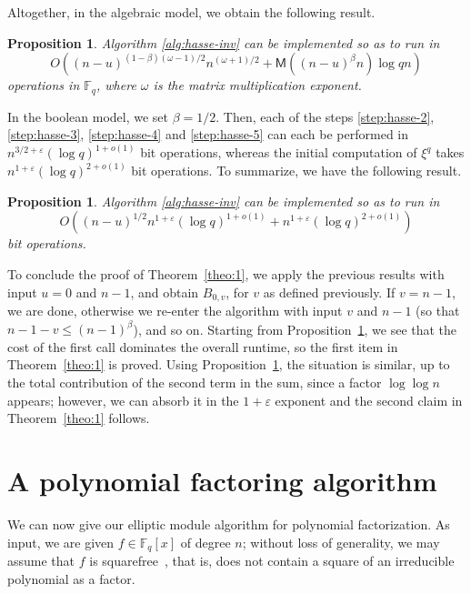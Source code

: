 \documentclass[12pt]{article}
\theoremstyle{plain}
\newtheorem{proposition}[theorem]{Proposition}
\theoremstyle{definition}
\def\F{\ensuremath{\mathbb{F}}}
\def\MM{\ensuremath{\mathsf{M}}}
\begin{document}
Altogether, in the algebraic model, we obtain the following result.
\begin{proposition}
  \label{theo:hasse-inv}
  Algorithm \ref{alg:hasse-inv} can be implemented so as to run in
  \[O((n-u)^{(1 - \beta)(\omega - 1) / 2} n^{(\omega + 1) / 2} + \MM((n-u)^{\beta}n)\log qn)\] 
  operations in $\F_q$, where $\omega$ is the matrix multiplication exponent.
\end{proposition}
In the boolean model, we set $\beta = 1/2$. Then, each of the steps
\ref{step:hasse-2}, \ref{step:hasse-3}, \ref{step:hasse-4} and
\ref{step:hasse-5} can each be performed in $n^{3/2+\varepsilon} (\log
q)^{1+o(1)}$ bit operations, whereas the initial computation of
$\xi^q$ takes $ n^{1+\varepsilon} (\log q)^{2+o(1)}$ bit operations. To
summarize, we have the following result.
 
\begin{proposition}
  \label{theo:hasse-inv-bit}
  Algorithm \ref{alg:hasse-inv} can be implemented so as to run in
  \[O((n-u)^{1/2} n^{1+\varepsilon} (\log q)^{1+o(1)} + n^{1+\varepsilon} (\log q)^{2+o(1)})\]
  bit operations.
\end{proposition}

To conclude the proof of Theorem~\ref{theo:1}, we apply the previous
results with input $u=0$ and $n-1$, and obtain $B_{0,v}$, for $v$ as
defined previously. If $v=n-1$, we are done, otherwise we re-enter the
algorithm with input $v$ and $n-1$ (so that $n-1-v \le
(n-1)^\beta$), and so on. Starting from Proposition~\ref{theo:hasse-inv},
we see that the cost of the first call dominates the
overall runtime, so the first item in Theorem~\ref{theo:1} is proved.
Using Proposition~\ref{theo:hasse-inv-bit}, the situation is similar,
up to the total contribution of the second term in the sum, since a factor
$\log\log n$ appears; however, we can absorb it in the $1+\varepsilon$ 
exponent and the second claim in Theorem~\ref{theo:1} follows.



\section{A polynomial factoring algorithm}\label{randomized_section}

We can now give our elliptic module algorithm for polynomial
factorization. As input, we are given $f \in\F_q[x]$ of degree $n$;
without loss of generality, we may assume that $f$ is
squarefree~\cite{knu,yun}, that is, does not contain a square of an
irreducible polynomial as a factor.
\end{document}
